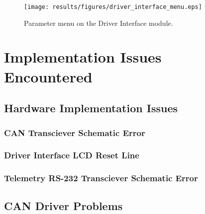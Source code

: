 \begin{figure}[h!]
 \centering
 \texttt{[image: results/figures/driver\_interface\_menu.eps]}
 \caption{Parameter menu on the Driver Interface module.}
 \label{fig:driver_interface_menu}
\end{figure}



\section{Implementation Issues Encountered}


\subsection{Hardware Implementation Issues}


\subsubsection{CAN Transciever Schematic Error}


\subsubsection{Driver Interface LCD Reset Line}


\subsubsection{Telemetry RS-232 Transciever Schematic Error}





\subsection{CAN Driver Problems}